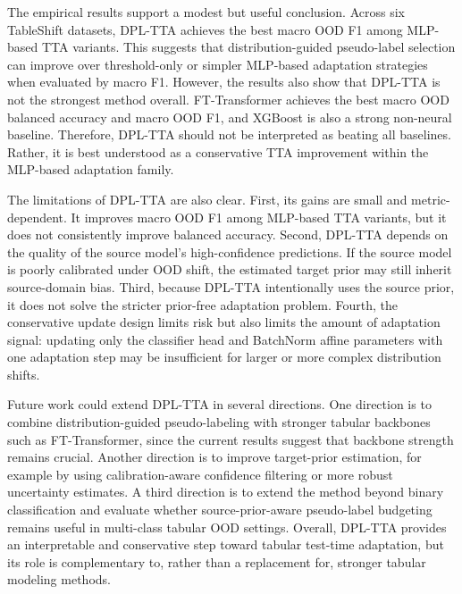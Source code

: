 The empirical results support a modest but useful conclusion. Across six TableShift datasets, DPL-TTA achieves the best macro OOD F1 among MLP-based TTA variants. This suggests that distribution-guided pseudo-label selection can improve over threshold-only or simpler MLP-based adaptation strategies when evaluated by macro F1. However, the results also show that DPL-TTA is not the strongest method overall. FT-Transformer achieves the best macro OOD balanced accuracy and macro OOD F1, and XGBoost is also a strong non-neural baseline. Therefore, DPL-TTA should not be interpreted as beating all baselines. Rather, it is best understood as a conservative TTA improvement within the MLP-based adaptation family.

The limitations of DPL-TTA are also clear. First, its gains are small and metric-dependent. It improves macro OOD F1 among MLP-based TTA variants, but it does not consistently improve balanced accuracy. Second, DPL-TTA depends on the quality of the source model's high-confidence predictions. If the source model is poorly calibrated under OOD shift, the estimated target prior may still inherit source-domain bias. Third, because DPL-TTA intentionally uses the source prior, it does not solve the stricter prior-free adaptation problem. Fourth, the conservative update design limits risk but also limits the amount of adaptation signal: updating only the classifier head and BatchNorm affine parameters with one adaptation step may be insufficient for larger or more complex distribution shifts.

Future work could extend DPL-TTA in several directions. One direction is to combine distribution-guided pseudo-labeling with stronger tabular backbones such as FT-Transformer, since the current results suggest that backbone strength remains crucial. Another direction is to improve target-prior estimation, for example by using calibration-aware confidence filtering or more robust uncertainty estimates. A third direction is to extend the method beyond binary classification and evaluate whether source-prior-aware pseudo-label budgeting remains useful in multi-class tabular OOD settings. Overall, DPL-TTA provides an interpretable and conservative step toward tabular test-time adaptation, but its role is complementary to, rather than a replacement for, stronger tabular modeling methods.